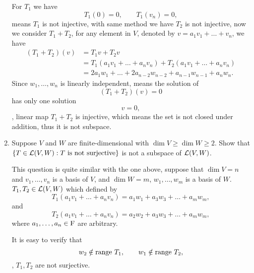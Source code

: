 \begin{enumerate}
\begin{solution}
            For $T_1$ we have 
            \[ T_1(0) = 0, \qquad T_1(v_n) = 0, \]
            means $T_1$ is not injective, with same method we have $T_2$ is not injective, now we consider $T_1 + T_2$, for 
            any element in $V$, denoted by $v = a_1v_1 + \dots + v_n$, we have 
            \begin{align*}
                (T_1+T_2)(v) &= T_1v + T_2v \\
                             &= T_1(a_1v_1 + \dots + a_nv_n) + T_2(a_1v_1+\dots+a_nv_n) \\
                             &= 2a_1w_1 + \ldots + 2a_{n-2}w_{n-2} + a_{n-1}w_{n-1} + a_nw_n.
            \end{align*}
            Since $w_1, \ldots, w_n$ is linearly independent, means the solution of 
            \[ (T_1+T_2)(v) = 0\]
            has only one solution 
            \[ v = 0,\]
            \ie, linear map $T_1 + T_2$ is injective, which means the set is not closed under addition, thus it is not subspace.
        \end{solution}
    \item Suppose $V$ and $W$ are finite-dimensional with $\dim{V} \geq \dim{W} \geq 2$. Show that 
        $\{ T \in \mathcal{L}(V, W): T \text{ is not surjective} \}$ is not a subspace of $\mathcal{L}(V, W)$.
        \begin{solution}
            This question is quite similar with the one above, suppose that $\dim{V}=n$ and $v_1, \ldots, v_n$ is a basis of 
            $V$, and $\dim{W} = m$, $w_1, \ldots, w_m$ is a basis of $W$. 
            $T_1, T_2 \in \mathcal{L}(V, W)$ which defined by
            \[ T_1(a_1v_1 + \dots + a_nv_n) = a_1w_1 + a_3w_3 + \dots + a_mw_m,\]
            and 
            \[ T_2(a_1v_1 + \dots + a_nv_n) = a_2w_2 + a_3w_3 + \dots + a_mw_m,\]
            where $a_1,\ldots, a_n \in \mathrm{F}$ are arbitrary.

            It is easy to verify that 
            \[ w_2 \notin \text{range}~T_1, \qquad w_1 \notin \text{range}~T_2, \]
            \ie, $T_1, T_2$ are not surjective.


\end{solution}
\end{enumerate}
